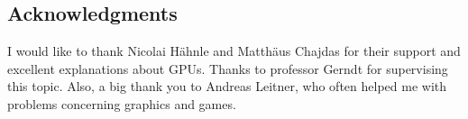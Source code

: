 \newpage
\vspace*{3.5cm}
\begin{center}
\begin{minipage}{12.5cm}
\section*{Acknowledgments}%
I would like to thank Nicolai Hähnle and Matthäus Chajdas for their support and excellent explanations about GPUs.
Thanks to professor Gerndt for supervising this topic.
Also, a big thank you to Andreas Leitner, who often helped me with problems concerning graphics and games.
\end{minipage}
\end{center}
